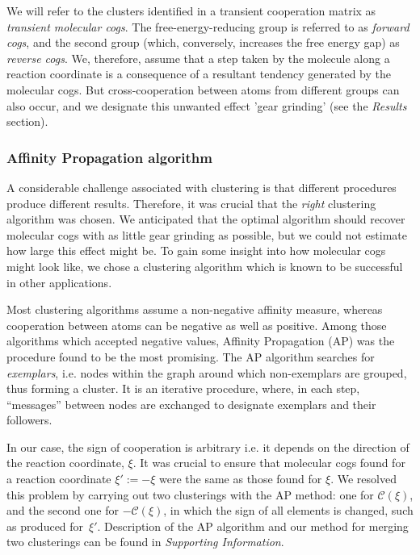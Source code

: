 \documentclass[a4paper,11pt,twoside]{book}%
\begin{document}
We will refer to the clusters identified in a transient cooperation matrix as \emph{transient molecular cogs}.
The free-energy-reducing group is referred to as \emph{forward cogs}, and the second group (which, conversely, increases the free energy gap) as \emph{reverse cogs}.
We, therefore, assume that a step taken by the molecule along a reaction coordinate is a consequence of a resultant tendency generated by the molecular cogs.
But cross-cooperation between atoms from different groups can also occur, and we {\color{black}designate} this unwanted effect 'gear grinding' (see the \emph{Results} section).

\subsubsection{Affinity Propagation algorithm}
A considerable challenge associated with clustering is that different procedures produce different results.
Therefore, it was crucial that the \emph{right} clustering algorithm was chosen.
We anticipated that the optimal algorithm should recover molecular cogs with as little gear grinding as possible, but we could not estimate how large this effect might be.
To gain some insight into how molecular cogs might look like, we chose a clustering algorithm which is known to be successful in other applications.

Most clustering algorithms assume a non-negative affinity measure, whereas cooperation between atoms can be negative as well as positive.
Among those algorithms which accepted negative values, Affinity Propagation (AP) was the procedure found to be the most promising\cite{frey2007clustering}.
The AP algorithm searches for \emph{exemplars}, i.e. nodes within the graph around which non-exemplars are grouped, thus forming a cluster.
It is an iterative procedure, where, in each step, ``messages'' between nodes are exchanged to designate exemplars and their followers.

In our case, the sign of cooperation is arbitrary i.e. it depends on the direction of the reaction coordinate, $\xi$.
It was crucial to ensure that molecular cogs found for a reaction coordinate $\xi':=-\xi$ were the same as those found for $\xi$.
We resolved this problem by carrying out two clusterings with the AP method: one for $\mathcal{C}(\xi)$, and the second one for $-\mathcal{C}(\xi)$, in which the sign of all elements is changed, such as produced for~$\xi'$.
Description of the AP algorithm and our method for merging two clusterings can be found in \emph{Supporting Information}.
\end{document}
